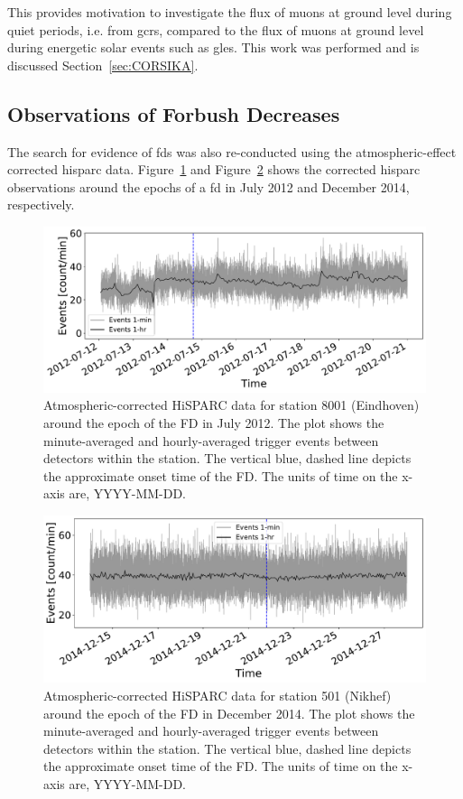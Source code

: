 This provides motivation to investigate the flux of muons at ground level during quiet periods, i.e. from \glspl{gcr}, compared to the flux of muons at ground level during energetic solar events such as \glspl{gle}. This work was performed and is discussed Section~\ref{sec:CORSIKA}.


\subsection{Observations of Forbush Decreases}

The search for evidence of \glspl{fd} was also re-conducted using the atmospheric-effect corrected \gls{hisparc} data. Figure~\ref{fig:FD_201207_8001_Pcorr} and Figure~\ref{fig:FD_201412_501_Pcorr} shows the corrected \gls{hisparc} observations around the epochs of a \gls{fd} in July 2012 and December 2014, respectively.

\begin{figure}[ht]
	\centering
	\includegraphics[width=0.65\columnwidth]{FD_201207_8001_CORR.pdf}
	\caption{Atmospheric-corrected HiSPARC data for station 8001 (Eindhoven) around the epoch of the FD in July 2012. The plot shows the minute-averaged and hourly-averaged trigger events between detectors within the station. The vertical blue, dashed line depicts the approximate onset time of the FD. The units of time on the x-axis are, YYYY-MM-DD.}
	\label{fig:FD_201207_8001_Pcorr}
\end{figure}

\begin{figure}[ht]
	\centering
	\includegraphics[width=0.65\columnwidth]{FD_201412_501_CORR.pdf}
	\caption{Atmospheric-corrected HiSPARC data for station 501 (Nikhef) around the epoch of the FD in December 2014. The plot shows the minute-averaged and hourly-averaged trigger events between detectors within the station. The vertical blue, dashed line depicts the approximate onset time of the FD. The units of time on the x-axis are, YYYY-MM-DD.}
	\label{fig:FD_201412_501_Pcorr}
\end{figure}


